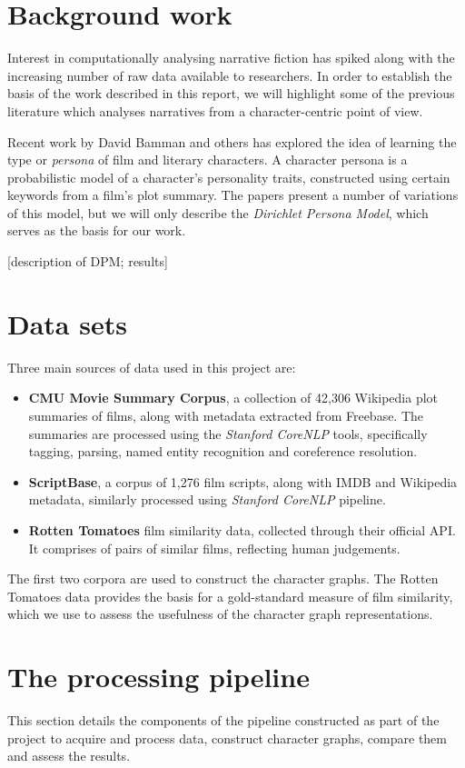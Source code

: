 \documentclass[bsc,frontabs,singlespacing,parskip]{infthesis} %
\begin{document}
\section{Background work}
Interest in computationally analysing narrative fiction has spiked along with the increasing number of raw data available to researchers. In order to establish the basis of the work described in this report, we will highlight some of the previous literature which analyses narratives from a character-centric point of view.

Recent work by David Bamman and others has explored the idea of learning the type or \textit{persona} of film \cite{Bamman2013} and literary \cite{Bamman2014} characters. A character persona is a probabilistic model of a character's personality traits, constructed using certain keywords from a film's plot summary. The papers present a number of variations of this model, but we will only describe the \textit{Dirichlet Persona Model}, which serves as the basis for our work.

[description of DPM; results]


\section{Data sets}
Three main sources of data used in this project are:
\begin{itemize}
	\item \textbf{CMU Movie Summary Corpus}, a collection of 42,306 Wikipedia plot summaries of films, along with metadata extracted from Freebase. The summaries are processed using the \textit{Stanford CoreNLP} tools, specifically tagging, parsing, named entity recognition and coreference resolution.
	\item \textbf{ScriptBase}, a corpus of 1,276 film scripts, along with IMDB and Wikipedia metadata, similarly processed using \textit{Stanford CoreNLP} pipeline.
	\item \textbf{Rotten Tomatoes} film similarity data, collected through their official API. It comprises of pairs of similar films, reflecting human judgements.
\end{itemize}

The first two corpora are used to construct the character graphs. The Rotten Tomatoes data provides the basis for a gold-standard measure of film similarity, which we use to assess the usefulness of the character graph representations.

\section{The processing pipeline}
This section details the components of the pipeline constructed as part of the project to acquire and process data, construct character graphs, compare them and assess the results.
\end{document}
